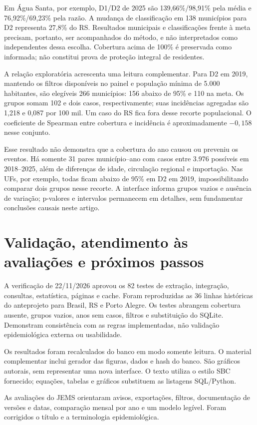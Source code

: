 \documentclass[12pt]{article}
\begin{document}
Em Água Santa, por exemplo, D1/D2 de 2025 são 139,66\%/98,91\% pela média e 76,92\%/69,23\% pela razão. A mudança de classificação em 138 municípios para D2 representa 27,8\% do RS. Resultados municipais e classificações frente à meta precisam, portanto, ser acompanhados do método, e não interpretados como independentes dessa escolha. Cobertura acima de 100\% é preservada como informada; não constitui prova de proteção integral de residentes.

A relação exploratória acrescenta uma leitura complementar. Para D2 em 2019, mantendo os filtros disponíveis no painel e população mínima de 5.000 habitantes, são elegíveis 266 municípios: 156 abaixo de 95\% e 110 na meta. Os grupos somam 102 e dois casos, respectivamente; suas incidências agregadas são 1,218 e 0,087 por 100 mil. Um caso do RS fica fora desse recorte populacional. O coeficiente de Spearman entre cobertura e incidência é aproximadamente $-0,158$ nesse conjunto.

Esse resultado não demonstra que a cobertura do ano causou ou preveniu os eventos. Há somente 31 pares município--ano com casos entre 3.976 possíveis em 2018--2025, além de diferenças de idade, circulação regional e importação. Nas UFs, por exemplo, todas ficam abaixo de 95\% em D2 em 2019, impossibilitando comparar dois grupos nesse recorte. A interface informa grupos vazios e ausência de variação; p-valores e intervalos permanecem em detalhes, sem fundamentar conclusões causais neste artigo.

\section{Validação, atendimento às avaliações e próximos passos}
A verificação de 22/11/2026 aprovou os 82 testes de extração, integração, consultas, estatística, páginas e cache. Foram reproduzidas as 36 linhas históricas do anteprojeto para Brasil, RS e Porto Alegre. Os testes abrangem cobertura ausente, grupos vazios, anos sem casos, filtros e substituição do SQLite. Demonstram consistência com as regras implementadas, não validação epidemiológica externa ou usabilidade.

Os resultados foram recalculados do banco em modo somente leitura. O material complementar inclui gerador das figuras, dados e hash do banco. São gráficos autorais, sem representar uma nova interface. O texto utiliza o estilo SBC fornecido; equações, tabelas e gráficos substituem as listagens SQL/Python.

As avaliações do JEMS orientaram avisos, exportações, filtros, documentação de versões e datas, comparação mensal por ano e um modelo legível. Foram corrigidos o título e a terminologia epidemiológica.
\end{document}
